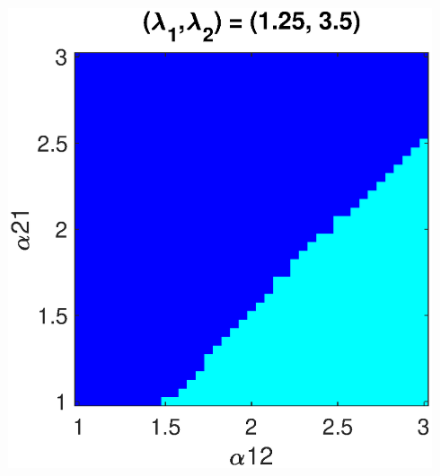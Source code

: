 \begin{figure}[h]
\begin{minipage}{0.32\linewidth}
  \end{minipage} 
   \begin{minipage}{0.32\linewidth}
  \begin{center}
\includegraphics[width=1\linewidth]{Images/photo24_6.eps}
\end{center}
  \end{minipage} 
  

\end{figure}
